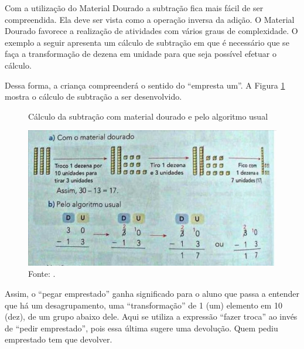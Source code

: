 \begin{refsection}
    \begin{center}       
    \end{center}

    Com a utilização do Material Dourado a subtração fica mais fácil de ser compreendida. Ela deve ser vista como a operação inversa da adição. O Material Dourado favorece a realização de atividades com vários graus de complexidade. O exemplo a seguir apresenta um cálculo de subtração em que é necessário que se faça a transformação de dezena em unidade para que seja possível efetuar o cálculo. 

    Dessa forma, a criança compreenderá o sentido do “empresta um”. A Figura \ref{fig:dante-subtracao} mostra o cálculo de subtração a ser desenvolvido.

    \begin{figure}[ht]%
        \centering%
        \caption{Cálculo da subtração com material dourado e pelo algoritmo usual}%
        \includegraphics[width=.75\textwidth]{articles/05-material-dourado-com/figura2.jpeg}%
        \caption*{Fonte: \textcite[p.~126]{DANTE2015Projeto}.}%
        \label{fig:dante-subtracao}%
    \end{figure}%

    Assim, o “pegar emprestado” ganha significado para o aluno que passa a entender que há um desagrupamento, uma “transformação” de 1 (um) elemento em 10 (dez), de um grupo abaixo dele. Aqui se utiliza a expressão “fazer troca” ao invés de “pedir emprestado”, pois essa última sugere uma devolução. Quem pediu emprestado tem que devolver.


\end{refsection}
